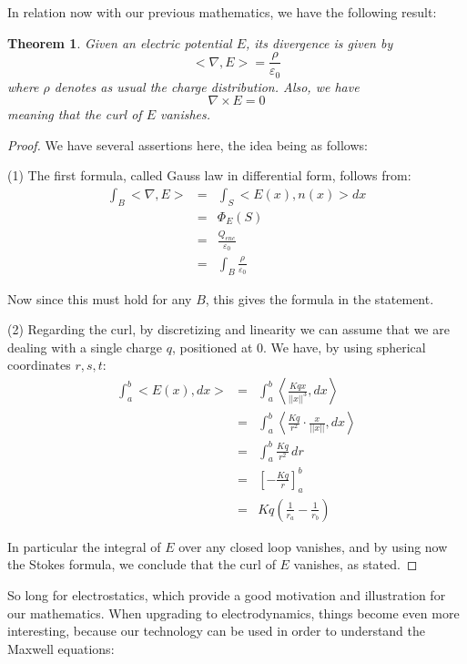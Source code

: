 \documentclass[12pt]{amsbook}
\newtheorem{theorem}{Theorem}[chapter]
\begin{document}
In relation now with our previous mathematics, we have the following result:

\begin{theorem}
Given an electric potential $E$, its divergence is given by
$$<\nabla,E>=\frac{\rho}{\varepsilon_0}$$
where $\rho$ denotes as usual the charge distribution. Also, we have
$$\nabla\times E=0$$
meaning that the curl of $E$ vanishes.
\end{theorem}

\begin{proof}
We have several assertions here, the idea being as follows:

\medskip

(1) The first formula, called Gauss law in differential form, follows from:
\begin{eqnarray*}
\int_B<\nabla,E>
&=&\int_S<E(x),n(x)>dx\\
&=&\Phi_E(S)\\
&=&\frac{Q_{enc}}{\varepsilon_0}\\
&=&\int_B\frac{\rho}{\varepsilon_0}
\end{eqnarray*}

Now since this must hold for any $B$, this gives the formula in the statement.

\medskip

(2) Regarding the curl, by discretizing and linearity we can assume that we are dealing with a single charge $q$, positioned at $0$. We have, by using spherical coordinates $r,s,t$:
\begin{eqnarray*}
\int_a^b<E(x),dx>
&=&\int_a^b\left<\frac{Kqx}{||x||^3},dx\right>\\
&=&\int_a^b\left<\frac{Kq}{r^2}\cdot\frac{x}{||x||},dx\right>\\
&=&\int_a^b\frac{Kq}{r^2}\,dr\\
&=&\left[-\frac{Kq}{r}\right]_a^b\\
&=&Kq\left(\frac{1}{r_a}-\frac{1}{r_b}\right)
\end{eqnarray*}

In particular the integral of $E$ over any closed loop vanishes, and by using now the Stokes formula, we conclude that the curl of $E$ vanishes, as stated.
\end{proof}

So long for electrostatics, which provide a good motivation and illustration for our mathematics. When upgrading to electrodynamics, things become even more interesting, because our technology can be used in order to understand the Maxwell equations:
\end{document}
